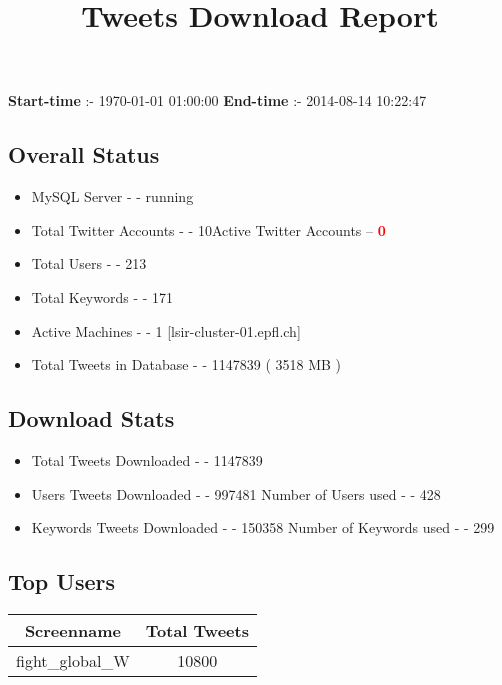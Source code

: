 \documentclass{article}\usepackage[T1]{fontenc}
\begin{document}
\title{\textbf{Tweets Download Report}}
               \date{}
                \maketitle
               \centerline{\textbf{Start-time} :- 1970-01-01 01:00:00 \hspace{40pt} \textbf{End-time} :- 2014-08-14 10:22:47}               \subsection*{Overall Status}                \begin{itemize}                \item MySQL Server - - running               \item Total Twitter Accounts - - 10\newline Active Twitter Accounts -- \textcolor{red}{\textbf{0}}               \item Total Users - - 213               \item Total Keywords - - 171               \item Active Machines - - 1 [lsir-cluster-01.epfl.ch]               \item Total Tweets in Database - - 1147839 ( 3518 MB )               \end{itemize}               \subsection*{Download Stats}                \begin{itemize}                \item Total Tweets Downloaded - - 1147839               \item Users Tweets Downloaded - - 997481 \newline Number of Users used - - 428               \item Keywords Tweets Downloaded - - 150358 \newline Number of Keywords used - - 299              \end{itemize}              \subsection*{Top Users}\begin{tabular}{|c|c|}         \hline         Screenname & Total Tweets \\ 
 \hline
fight\_global\_W & 10800\\ 

\end{tabular}
\end{document}
